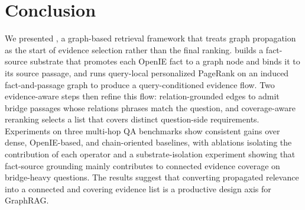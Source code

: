 %
%

\section{Conclusion}
\label{sec:conclusion}

We presented \methodname{}, a graph-based retrieval framework that
treats graph propagation as the start of evidence selection rather
than the final ranking. \methodname{} builds a fact-source substrate
that promotes each OpenIE fact to a graph node and binds it to its
source passage, and runs query-local personalized PageRank on an
induced fact-and-passage graph to produce a query-conditioned
evidence flow. Two evidence-aware steps then refine this flow:
relation-grounded edges to admit bridge passages whose relations
phrases match the question, and coverage-aware reranking selects a
list that covers distinct question-side requirements. Experiments
on three multi-hop QA benchmarks show consistent gains over dense,
OpenIE-based, and chain-oriented baselines, with ablations
isolating the contribution of each operator and a substrate-isolation
experiment showing that fact-source grounding mainly contributes to
connected evidence coverage on bridge-heavy questions. The results suggest
that converting propagated relevance into a connected and covering
evidence list is a productive design axis for GraphRAG.
